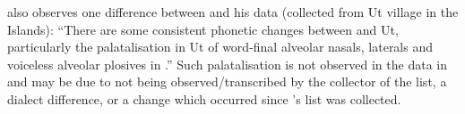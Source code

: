 \citet[84]{Hughes1987} also observes one difference between 
and his  data (collected from Ut village in the  Islands):
“There are some consistent phonetic changes between 
and Ut, particularly the palatalisation in Ut of word-final alveolar
nasals, laterals and voiceless alveolar plosives in .” Such palatalisation
is not observed in the  data in \citet{Wallace1869}
and may be due to not being observed/transcribed by the collector
of the list, a dialect difference, or a change
which occurred since \citeauthor{Wallace1869}’s
list was collected.

